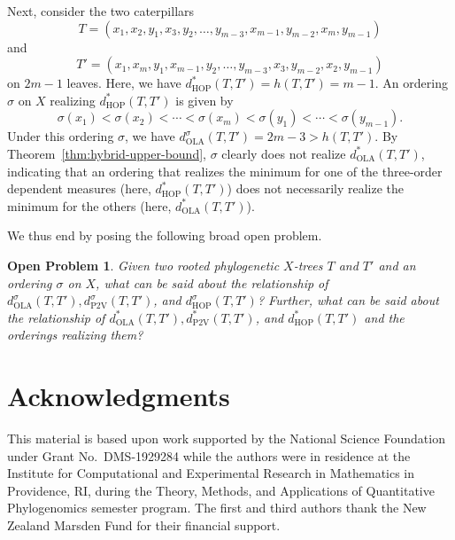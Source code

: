 \documentclass{article}
\newtheorem{problem}{Open Problem}
\newcommand{\HOP}{\mathrm{HOP}}
\newcommand{\OLA}{\mathrm{OLA}}
\newcommand{\PV}{\mathrm{P2V}}
\begin{document}
Next, consider the two caterpillars 
$$T = (x_1, x_2, y_1, x_3, y_2, \ldots, y_{m-3}, x_{m-1}, y_{m-2}, x_m, y_{m-1})$$
and
$$T' = (x_1, x_m, y_1, x_{m-1}, y_2, \ldots, y_{m-3}, x_3, y_{m-2}, x_2, y_{m-1})$$ on $2m-1$ leaves. Here, we have $d^*_\HOP(T,T')=h(T,T') = m-1$.
An ordering $\sigma$ on $X$ realizing $d^*_\HOP(T,T')$ is  given by \[ \sigma(x_1) < \sigma(x_2) < \cdots < \sigma(x_m) < \sigma(y_1) < \cdots < \sigma(y_{m-1}). \]
Under this ordering $\sigma$, we have $d^\sigma_\OLA(T,T') = 2m-3 > h(T,T')$. By Theorem~\ref{thm:hybrid-upper-bound}, $\sigma$ clearly does not realize $d^\ast_\OLA(T,T')$, indicating that an ordering that realizes the minimum for one of the three-order dependent measures (here, $d^*_\HOP(T,T')$) does not necessarily realize the minimum for the others (here, $d^\ast_\OLA(T,T')$).
 
We thus end by posing the following broad open problem.
\begin{problem} 
Given two rooted phylogenetic $X$-trees $T$ and $T'$ and an ordering $\sigma$ on $X$, what can be said about the relationship of $d^\sigma_\OLA(T,T'), d^\sigma_\PV(T,T')$, and $d^\sigma_\HOP(T,T')$? Further, what can be said about the relationship of $d^\ast_\OLA(T,T'), d^\ast_\PV(T,T')$, and $d^\ast_\HOP(T,T')$ and the orderings realizing them?
\end{problem}

\section{Acknowledgments}

This material is based upon work supported by the National Science Foundation under Grant No.~DMS-1929284 while the authors were in residence at the Institute for Computational and Experimental Research in Mathematics in Providence, RI, during the Theory, Methods, and Applications of Quantitative Phylogenomics semester program. The first and third authors thank the New Zealand Marsden Fund for their financial support.




\end{document}
